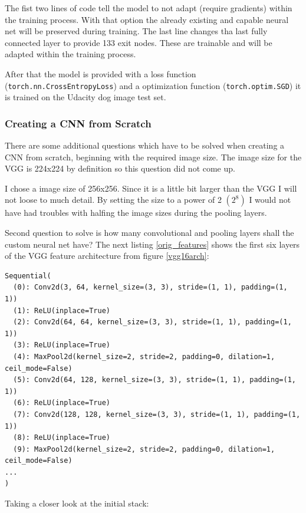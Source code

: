 \documentclass[paper=A4, DIV=10, parskip=half]{scrartcl}
\begin{document}
The fist two lines of code tell the model to not adapt (require gradients)
within the training process. With that option the already existing and capable
neural net will be preserved during training. The last line changes tha last
fully connected layer to provide 133 exit nodes. These are trainable and will be
adapted within the training process. 

After that the model is provided with a loss function
(\lstinline{torch.nn.CrossEntropyLoss}) and a optimization function
(\lstinline{torch.optim.SGD}) it is trained on the Udacity dog image test set.

\subsubsection*{Creating a CNN from Scratch}

There are some additional questions which have to be solved when creating a CNN
from scratch, beginning with the required image size. The image size for the VGG
is 224x224 by definition so this question did not come up.

I chose a image size of 256x256. Since it is a little bit larger than the VGG I
will not loose to much detail. By setting the size to a power of 2 $(2^8)$ I
would not have had troubles with halfing the image sizes during the pooling
layers.

Second question to solve is how many convolutional and pooling layers shall the
custom neural net have? The next listing \ref{orig_features} shows the first six
layers of the VGG feature architecture from figure \ref{vgg16arch}:

\begin{lstlisting}[caption=Original VGG16 Features, label=orig_features]
Sequential(
  (0): Conv2d(3, 64, kernel_size=(3, 3), stride=(1, 1), padding=(1, 1))
  (1): ReLU(inplace=True)
  (2): Conv2d(64, 64, kernel_size=(3, 3), stride=(1, 1), padding=(1, 1))
  (3): ReLU(inplace=True)
  (4): MaxPool2d(kernel_size=2, stride=2, padding=0, dilation=1, ceil_mode=False)
  (5): Conv2d(64, 128, kernel_size=(3, 3), stride=(1, 1), padding=(1, 1))
  (6): ReLU(inplace=True)
  (7): Conv2d(128, 128, kernel_size=(3, 3), stride=(1, 1), padding=(1, 1))
  (8): ReLU(inplace=True)
  (9): MaxPool2d(kernel_size=2, stride=2, padding=0, dilation=1, ceil_mode=False)
...
)
\end{lstlisting}

Taking a closer look at the initial stack:
\end{document}
